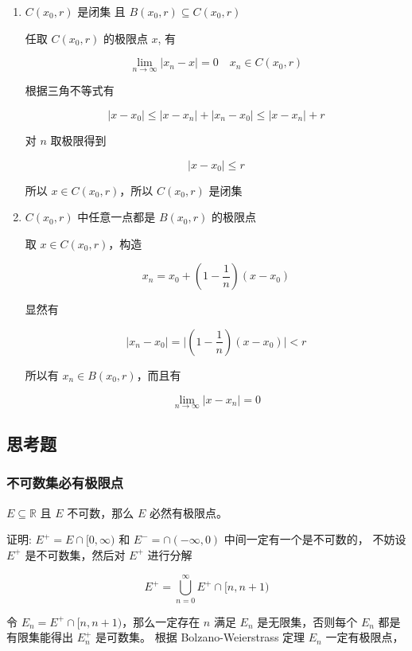 \documentclass[12pt,a4paper]{ctexart}
\begin{document}
\begin{enumerate}
    \item $C(x_0, r)$ 是闭集 且 $B(x_0, r) \subseteq C(x_0, r)$
    
    任取 $C(x_0, r)$ 的极限点 $x$, 有

    \[
        \lim_{n \to \infty} \lvert x_n -x\rvert =0\quad x_n \in C(x_0, r)
    \]

    根据三角不等式有

    \[
        \lvert x -x_0\rvert \le \lvert x-x_n\rvert + \lvert x_n -x_0\rvert \le  \lvert x-x_n\rvert + r
    \]

    对 $n$ 取极限得到

    \[
        \lvert x -x_0 \rvert \le r
    \]

    所以 $x \in C(x_0, r)$，所以 $C(x_0,r)$ 是闭集

    \item $C(x_0, r)$ 中任意一点都是 $B(x_0, r)$ 的极限点

    取 $x \in C(x_0, r)$，构造

    \[
        x_n = x_0 + (1-\frac{1}{n})(x-x_0)
    \]

    显然有

    \[
        \lvert x_n -x_0 \rvert = \lvert (1-\frac{1}{n})(x-x_0) \rvert < r
    \]

    所以有 $x_n \in B(x_0, r)$，而且有

    \[
        \lim_{n \to \infty} \lvert x -x_n \rvert = 0
    \]

\end{enumerate}

\subsection{思考题}

\subsubsection{不可数集必有极限点}

$E \subseteq \mathbb{R}$ 且 $E$ 不可数，那么 $E$ 必然有极限点。

证明: $E^+ = E \cap [0,\infty)$ 和 $E^- = \cap (-\infty, 0)$ 中间一定有一个是不可数的，
不妨设 $E^+$ 是不可数集，然后对 $E^+$ 进行分解

\[
E^+ = \bigcup_{n=0}^{\infty}E^+ \cap [n,n+1)
\]

令 $E_n = E^+ \cap [n,n+1)$，那么一定存在 $n$ 满足 $E_n$ 是无限集，否则每个 $E_n$ 都是有限集能得出 $E_n^+$ 是可数集。
根据 Bolzano-Weierstrass 定理 $E_n$ 一定有极限点，
\end{document}

